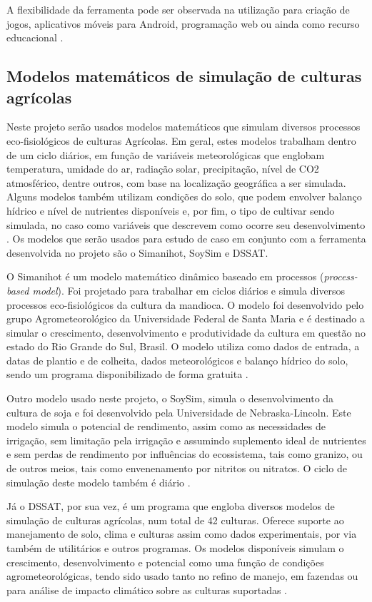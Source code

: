 \documentclass[12pt]{article}
\begin{document}
	A flexibilidade da ferramenta pode ser observada na utilização para criação de jogos, aplicativos móveis para Android, programação web ou ainda como recurso educacional \cite{blocklyGames,blocklymobile,blocklyJavaScript,blocklyEducation}.
	
	\subsection{Modelos matemáticos de simulação de culturas agrícolas}
	
	Neste projeto serão usados modelos matemáticos que simulam diversos processos eco-fisiológicos de culturas Agrícolas. Em geral, estes modelos trabalham dentro de um ciclo diários, em função de variáveis meteorológicas que englobam temperatura, umidade do ar, radiação solar, precipitação, nível de CO2 atmosférico, dentre outros, com base na localização geográfica a ser simulada. Alguns modelos também utilizam condições do solo, que podem envolver balanço hídrico e nível de nutrientes disponíveis e, por fim, o tipo de cultivar sendo simulada, no caso como variáveis que descrevem como ocorre seu desenvolvimento \cite{simanihotArt}. Os modelos que serão usados para estudo de caso em conjunto com a ferramenta desenvolvida no projeto são o Simanihot, SoySim e DSSAT.

	O Simanihot é um modelo matemático dinâmico baseado em processos (\emph{process-based model}). Foi projetado para trabalhar em ciclos diários e simula diversos processos eco-fisiológicos da cultura da mandioca. O modelo foi desenvolvido pelo grupo Agrometeorológico da Universidade Federal de Santa Maria e é destinado a simular o crescimento, desenvolvimento e produtividade da cultura em questão no estado do Rio Grande do Sul, Brasil. O modelo utiliza como dados de entrada, a datas de plantio e de colheita, dados meteorológicos e balanço hídrico do solo, sendo um programa disponibilizado de forma gratuita \cite{Simanihot}.

	Outro modelo usado neste projeto, o SoySim, simula o desenvolvimento da cultura de soja e foi desenvolvido pela Universidade de Nebraska-Lincoln. Este modelo simula o potencial de rendimento, assim como as necessidades de irrigação, sem limitação pela irrigação e assumindo suplemento ideal de nutrientes e sem perdas de rendimento por influências do ecossistema, tais como granizo, ou de outros meios, tais como envenenamento por nitritos ou nitratos. O ciclo de simulação deste modelo também é diário \cite{SoySim}.
	
	Já o DSSAT, por sua vez, é um programa que engloba diversos modelos de simulação de culturas agrícolas, num total de 42 culturas. Oferece suporte ao manejamento de solo, clima e culturas assim como dados experimentais, por via também de utilitários e outros programas. Os modelos disponíveis simulam o crescimento, desenvolvimento e potencial como uma função de condições agrometeorológicas, tendo sido usado tanto no refino de manejo, em fazendas ou para análise de impacto climático sobre as culturas suportadas \cite{dssat}.
	
\end{document}
